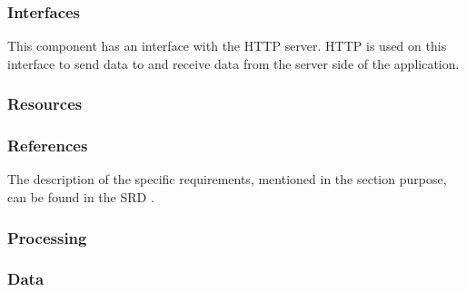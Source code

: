 \subsubsection*{Interfaces}
This component has an interface with the HTTP server. HTTP is used on this interface to send data to and receive data from the server side of the application. 

\subsubsection*{Resources}

\subsubsection*{References}
The description of the specific requirements, mentioned in the section purpose, can be found in the SRD \cite{srd}.

\subsubsection*{Processing}

\subsubsection*{Data}
